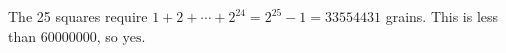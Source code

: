 The 25 squares require $1+2+\cdots+2^{24}=2^{25}-1=33554431$ grains. This is less than 60000000, so $\boxed{\text{yes}}$.
